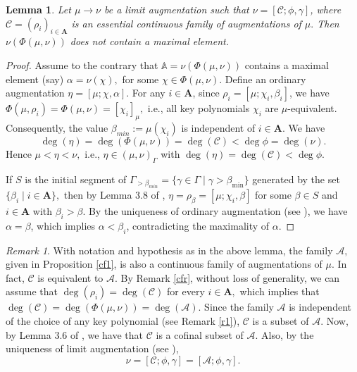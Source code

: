 \documentclass[11pt]{amsart}
\newtheorem{lemma}[theorem]{Lemma}
\theoremstyle{definition}
\theoremstyle{remark}
\newtheorem{remark}[theorem]{Remark}
\numberwithin{equation}{section}
\begin{document}
\begin{lemma}
	Let $\mu\longrightarrow\nu$ be a limit augmentation such that $\nu=[\mathcal{C};\phi,\gamma]$, where $\mathcal{C}=(\rho_i)_{i\in\mathbf{A}}$ is an essential continuous family of augmentations of $\mu.$ Then $\nu(\Phi(\mu,\nu))$ does not contain a maximal element.
\end{lemma}
\begin{proof}
	Assume to the contrary that $\mathbb{A}=\nu(\Phi(\mu,\nu))$ contains a maximal element (say) $\alpha=\nu(\chi),$ for some $\chi\in\Phi(\mu,\nu).$ Define an ordinary augmentation $\eta=[\mu;\chi,\alpha].$ For any $i\in\mathbf{A}$, since $\rho_i=[\mu;\chi_i,\beta_i]$, we have $\Phi(\mu,\rho_i)=\Phi(\mu,\nu)=[\chi_i]_{\mu},$ i.e., all key polynomials $\chi_i$ are $\mu$-equivalent. Consequently, the value $\beta_{min}:=\mu(\chi_i)$ is independent of $i\in\mathbf{A}$. We have \[\deg(\eta)=\deg(\Phi(\mu,\nu))=\deg(\mathcal{C})<\deg\phi=\deg(\nu).\] Hence $\mu<\eta<\nu,$ i.e., $\eta\in(\mu,\nu)_{\Gamma}$ with $\deg(\eta)=\deg(\mathcal{C})<\deg\phi.$ 
	
	If $S$ is the initial segment of $\Gamma_{>\beta_{min}}=\{\gamma\in\Gamma\mid\gamma>\beta_{\min}\}$ generated by the set $\{\beta_i\mid i\in\mathbf{A}\},$ then by Lemma 3.8 of \cite{EN1}, $\eta=\rho_\beta=[\mu;\chi_i,\beta]$ for some $\beta\in S$ and $i\in\mathbf{A}$ with $\beta_i>\beta.$ By the uniqueness of ordinary augmentation (see \cite[Lemma 2.8]{EN1}), we have $\alpha=\beta$, which implies $\alpha<\beta_i$, contradicting the maximality of $\alpha.$ 
	\end{proof}
	
	\begin{remark}\label{lmr}
		With notation and hypothesis as in the above lemma, the family $\mathcal{A},$ given in Proposition \ref{cf1}, is also a continuous family of augmentations of $\mu.$ In fact, $\mathcal{C}$ is equivalent to $\mathcal{A}$. By Remark \ref{cfr}, without loss of generality, we can assume that $\deg(\rho_i)=\deg(\mathcal{C})$ for every $i\in\mathbf{A},$ which implies that $\deg(\mathcal{C})=\deg(\Phi(\mu,\nu))=\deg(\mathcal{A})$. Since the family $\mathcal{A}$ is independent of the choice of any key polynomial (see Remark \ref{r1}), $\mathcal{C}$ is a subset of $\mathcal{A}.$ Now, by Lemma 3.6 of \cite{EN1}, we have that $\mathcal{C}$ is a cofinal subset of $\mathcal{A}$. Also, by the uniqueness of limit augmentation (see \cite[Lemma 3.7]{EN1}),  \[\nu=[\mathcal{C};\phi,\gamma]=[\mathcal{A};\phi,\gamma].\]
	\end{remark}
\end{document}
